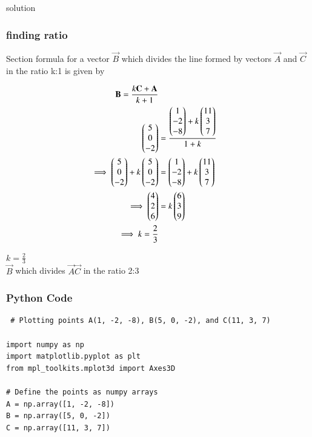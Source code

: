 \documentclass{beamer}
\begin{document}
\begin{frame}{solution}
    \frametitle{finding ratio}
    Section formula for a vector $\vec{B}$ which divides the line formed by vectors $\vec{A}$ and $\vec{C}$ in the ratio k:1 is given by

\begin{align}
    \mathbf{B}=\frac{k\mathbf{C}+\mathbf{A}}{k+1}\\
             \begin{pmatrix}5\\0\\-2\end{pmatrix} &=\frac{{\begin{pmatrix}1\\-2\\-8\end{pmatrix}+k\begin{pmatrix}11\\3\\7\end{pmatrix}}}{1+k}\\
    \implies\begin{pmatrix}5\\0\\-2\end{pmatrix} + k\begin{pmatrix}5\\0\\-2\end{pmatrix} &=\begin{pmatrix}1\\-2\\-8\end{pmatrix}+k\begin{pmatrix}11\\3\\7\end{pmatrix}\\ 
    \implies \begin{pmatrix}4 \\2 \\6\end{pmatrix} &= k\begin{pmatrix}6 \\ 3 \\9\end{pmatrix}\\
    \implies k = \frac{2}{3}
\end{align}
\end{frame}
\begin{frame}
$k=\frac{2}{3}$\\
     $\vec{B}$ which divides  $\vec{A}\vec{C}$ in the ratio 2:3


\end{frame}






\begin{frame}[fragile]
    \frametitle{Python Code}
    \begin{lstlisting}
 # Plotting points A(1, -2, -8), B(5, 0, -2), and C(11, 3, 7)
 
import numpy as np
import matplotlib.pyplot as plt
from mpl_toolkits.mplot3d import Axes3D

# Define the points as numpy arrays
A = np.array([1, -2, -8])
B = np.array([5, 0, -2])
C = np.array([11, 3, 7])
\end{lstlisting}
\end{frame}
\end{document}
